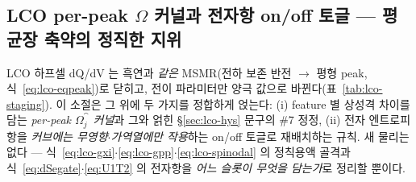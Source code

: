 \subsection{LCO per-peak $\Omega$ 커널과 전자항 on/off 토글 --- 평균장 축약의 정직한 지위}\label{ssec:lco-omega}
LCO 하프셀 dQ/dV 는 흑연과 \emph{같은} MSMR(전하 보존 반전 $\to$ 평형 peak, 식~\eqref{eq:lco-eqpeak})로 닫히고,
전이 파라미터만 양극 값으로 바뀐다(표~\ref{tab:lco-staging}). 이 소절은 그 위에 두 가지를 정합하게 얹는다:
(i) feature 별 상성격 차이를 담는 \emph{per-peak $\Omega_j^\cat$ 커널}과 그와 얽힌 \S\ref{sec:lco-hys} 문구의
\#7 정정, (ii) 전자 엔트로피 항을 \emph{커브에는 무영향$\cdot$가역열에만 작용}하는 on/off 토글로 재배치하는 규칙.
새 물리는 없다 --- 식~\eqref{eq:lco-gxi}$\cdot$\eqref{eq:lco-gpp}$\cdot$\eqref{eq:lco-spinodal} 의 정칙용액 골격과
식~\eqref{eq:dSegate}$\cdot$\eqref{eq:U1T2} 의 전자항을 \emph{어느 슬롯이 무엇을 담는가}로 정리할 뿐이다.

